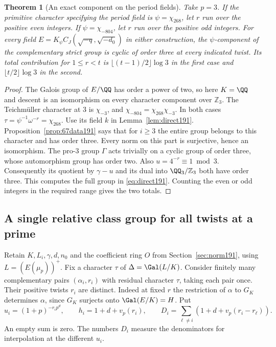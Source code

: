 \documentclass[a4paper,11pt]{article}
\newtheorem{theorem}[proposition]{Theorem}
\theoremstyle{definition}
\theoremstyle{remark}
\newcommand{\ZZ}{\mathbb Z}\newcommand{\ord}{\operatorname{ord}}
\numberwithin{equation}{section}
\begin{document}
\begin{theorem}[An exact component on the period fields]\label{thm:67strict191}
Take \(p=3\). If the primitive character specifying the period
field is \(\psi=\chi_{268}\), let \(r\) run over the positive
even integers. If \(\psi=\chi_{-804}\), let \(r\) run over the
positive odd integers. For every field
\(E=K_\psi C_J(\sqrt{-q},\sqrt{-d_0})\) in either construction,
the \(\psi\)-component of the complementary strict group is
cyclic of order three at every indicated twist. Its total
contribution for \(1\le r<t\) is
\(\lfloor(t-1)/2\rfloor\log3\) in the first case and
\(\lfloor t/2\rfloor\log3\) in the second.
\end{theorem}
\begin{proof}
The Galois group of \(E/\QQ\) has order a power of two, so here
\(K=\QQ\) and descent is an isomorphism on every character
component over \(\ZZ_3\). The Teichmüller character at 3 is
\(\chi_{-3}\), and \(\chi_{-804}=\chi_{268}\chi_{-3}\).
In both cases \(\tau=\psi^{-1}\omega^{-r}=\chi_{268}\).
Use its field \(k\) in Lemma~\ref{lem:direct191}.
Proposition~\ref{prop:67data191} says that for \(i\ge3\)
the entire group belongs to this character and has order three.
Every norm on this part is surjective, hence an isomorphism.
The pro-\(3\) group \(\Gamma\) acts trivially on a cyclic group
of order three, whose automorphism group has order two. Also
\(u=4^{-r}\equiv1\bmod3\). Consequently its quotient by
\(\gamma-u\) and its dual into \(\QQ_3/\ZZ_3\) both have order
three. This computes the full group in \eqref{eq:direct191}.
Counting the even or odd integers in the required range gives
the two totals.
\end{proof}

\subsection{A single relative class group for all twists at a prime}\label{nav:III-26}
\label{sec:joint193}

Retain \(K,L_i,\gamma,d,n_0\) and the coefficient ring \(O\)
from Section~\ref{sec:norm191}, using \(L=(E(\mu_p))^+\).
Fix a character \(\tau\) of \(\Delta=\Gal(L/K)\).
Consider finitely many complementary pairs \((\alpha_i,r_i)\)
with residual character \(\tau\), taking each pair once.
Their positive twists \(r_i\) are distinct. Indeed at fixed \(r\)
the restriction of \(\alpha\) to \(G_K\) determines \(\alpha\),
since \(G_K\) surjects onto \(\Gal(E/K)=H\). Put
\[
   u_i=(1+p)^{-r_i p^d},\qquad h_i=1+d+v_p(r_i),\qquad
   D_i=\sum_{\ell\ne i}(1+d+v_p(r_i-r_\ell)).
\]
An empty sum is zero. The numbers \(D_i\) measure the
denominators for interpolation at the different \(u_i\).
\end{document}
